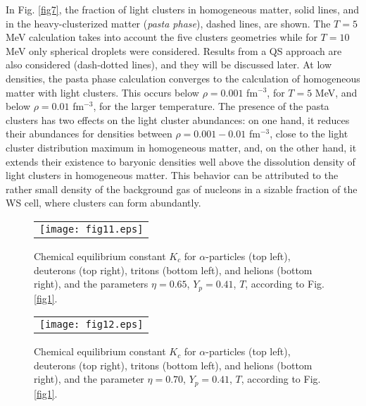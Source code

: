 \documentclass[aps,prc,nofootinbib,twocolumn,showpacs]{revtex4-1}
\begin{document}
In Fig. \ref{fig7}, the
fraction of light clusters in homogeneous matter, solid lines, and
in the heavy-clusterized matter ({\it pasta phase}), dashed lines, are
shown. The $T=5$ MeV calculation takes into account the five clusters
geometries while for $T=10$ MeV only spherical droplets were considered. Results from a QS approach are also considered (dash-dotted lines), and they will be discussed later. At low densities, the pasta
phase calculation converges to the calculation of homogeneous matter with light clusters. This occurs below $\rho=0.001$ fm$^{-3}$, for $T=5$ MeV,
and below $\rho=0.01$ fm$^{-3}$, for the larger temperature. The presence of
the pasta clusters has two effects on the light cluster abundances:
on one hand, it reduces their abundances  for densities between
$\rho=0.001-0.01$ fm$^{-3}$, close  to the light cluster distribution maximum
in  homogeneous matter, and,
on the other hand, it extends their existence to baryonic densities well above the dissolution density of light clusters in homogeneous
matter. This behavior can be attributed  to the rather small density
of the background gas of nucleons in
a sizable fraction of the WS cell, where clusters can form abundantly.


\begin{figure*}[!htbp]
\begin{tabular}{c}
     \texttt{[image: fig11.eps]}
\end{tabular}
    \caption{Chemical equilibrium constant $K_c$ for
      $\alpha$-particles (top left), deuterons (top right), tritons (bottom left), and helions (bottom right), and the parameters $\eta=0.65$, $Y_p = 0.41$, $T$, according to Fig. \ref{fig1}. }
\label{fig11}
\end{figure*}

\begin{figure*}[!htbp]
\begin{tabular}{c}
     \texttt{[image: fig12.eps]}
\end{tabular}
    \caption{Chemical equilibrium constant $K_c$ for
      $\alpha$-particles (top left), deuterons (top right), tritons (bottom left), and helions (bottom right), and the parameter $\eta=0.70$, $Y_p = 0.41$, $T$, according to Fig. \ref{fig1}.}
\label{fig12}
\end{figure*}
\end{document}
